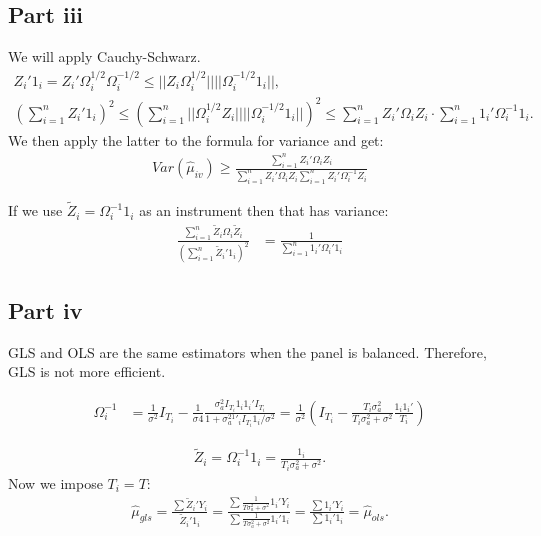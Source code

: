 \documentclass[11pt]{article} %
\begin{document}
\subsection{Part iii}
We will apply Cauchy-Schwarz. 
\begin{align*}
Z_{i}'1_i = Z_i'\Omega_i^{1/2}\Omega_i^{-1/2}\leq ||Z_i\Omega_i^{1/2}|| ||\Omega_i^{-1/2}1_i ||,\\
\left( \sum_{i=1}^n Z_i'1_i \right)^2 \leq \left( \sum_{i=1}^n ||\Omega_i^{1/2}Z_i||||\Omega_i^{-1/2}1_i|| \right)^2 \leq \sum_{i=1}^n Z_i'\Omega_i Z_i \cdot \sum_{i=1}^n 1_i'\Omega_i^{-1}1_i.
\end{align*}
We then apply the latter to the formula for variance and get:
\begin{align*}
Var(\hat{\mu}_{iv}) \geq \frac{\sum_{i=1}^nZ_i'\Omega_iZ_i}{\sum_{i=1}^nZ_i'\Omega_iZ_i \sum_{i=1}^nZ_i'\Omega_i^{-1}Z_i}
\end{align*}

If we use $\tilde{Z}_i = \Omega_i^{-1}1_i$ as an instrument then that has variance:
\begin{align*}
\frac{\sum_{i=1}^{n}\tilde{Z}_i\Omega_i\tilde{Z}_i}{(\sum_{i=1}^n \tilde{Z}_i'1_i)^2} &= \frac{1}{\sum_{i=1}^n 1_i'\Omega_i'1_i}
\end{align*}
\subsection{Part iv}
GLS and OLS are the same estimators when the panel is balanced. Therefore, GLS is not more efficient.

\begin{align*}
\Omega_i^{-1} &= \frac{1}{\sigma^2}I_{T_i} - \frac{1}{\sigma4}\frac{\sigma^2_aI_{T_i}1_i1_i'I_{T_i}}{1+\sigma_a^21'_iI_{T_i}1_i/\sigma^2} = \frac{1}{\sigma^2}\left( I_{T_i} - \frac{T_i\sigma^2_{a}}{T_i\sigma^2_a + \sigma^2}\frac{1_i1_i'}{T_i} \right)
\end{align*}

\begin{align*}
\tilde{Z}_i = \Omega_i^{-1}1_i = \frac{1_i}{T_i\sigma_a^2 + \sigma^2}.
\end{align*}
Now we impose $T_i = T$:
\begin{align*}
\hat{\mu}_{gls} = \frac{\sum \tilde{Z}_i'Y_i}{\tilde{Z}_i'1_i} = \frac{\sum \frac{1}{T\sigma_a^2 + \sigma^2}1_i'Y_i}{\sum \frac{1}{T\sigma_a^2 + \sigma^2}1_i'1_i} =  \frac{\sum 1_i'Y_i}{\sum1_i'1_i} = \hat{\mu}_{ols}.
\end{align*}
\end{document}
